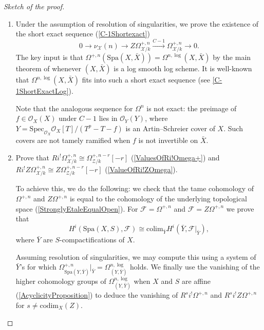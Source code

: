 \documentclass{amsart}
\def\Spa{\textrm{Spa}}
\def\Spec{\textrm{Spec}}
\theoremstyle{definition}
\numberwithin{equation}{section}
\begin{document}
\begin{proof}[Sketch of the proof]
	\begin{enumerate}
			\item Under the assumption of resolution of singularities, we prove the existence of the short exact sequence (\cref{C-1Shortexact})
		\[
		0 \to \nu_{\mathcal{X}}(n) \to Z\Omega^{+,n}_{\mathcal{X}/k} \xrightarrow{C - 1} \Omega^{+,n}_{\mathcal{X}/k} \to 0.
		\]
		The key input is that $\Omega^{+,n}(\Spa(X, \bar{X})) = \Omega^{n,\log}(X, \bar{X})$ by the main theorem of \cite{LogDiff} whenever $(X, \bar{X})$ is a log smooth log scheme. It is well-known that $\Omega^{n,\log}(X, \bar{X})$ fits into such a short exact sequence (see \cref{C-1ShortExactLog}).
		
		
			Note that the analogous sequence for $\Omega^n$ is not exact: the preimage of $f \in \mathcal{O}_X(X)$ under $C - 1$ lies in $\mathcal{O}_Y(Y)$, where $Y = \Spec_{\mathcal{O}_X} \mathcal{O}_X[T]/(T^p - T - f)$ is an Artin--Schreier cover of $X$. Such covers are not tamely ramified when $f$ is not invertible on $\bar{X}$.
					
			\item Prove that $Ri^!\Omega^{+,n}_{\mathcal{X}/k}\cong \Omega^{+,n-r}_{\mathcal{Z}/k}[-r]$ (\cref{ValuesOfRi!Omega+}) and \break $Ri^!Z\Omega^{+,n}_{\mathcal{X}/k}\cong Z\Omega^{+,n-r}_{\mathcal{Z}/k}[-r]$ (\cref{ValueOfRi!ZOmega}).
		
		 To achieve this, we do the following: we check that the tame cohomology of $\Omega^{+,n}$ and $Z\Omega^{+,n}$ is equal to the cohomology of the underlying topological space (\cref{StronglyEtaleEqualOpen}). For $\mathcal{F}=\Omega^{+,n}$ and $\mathcal{F}=Z\Omega^{+,n}$ we prove that  
		\[H^i(\Spa(X,S),\mathcal{F})\cong \textrm{colim}_{\bar{Y}} H^i(\bar{Y},\mathcal{F}|_{\bar{Y}}),
		\]
		where $\bar{Y}$ are $S$-compactifications of $X$.
		
		Assuming resolution of singularities, we may compute this using a system of $\bar{Y}$'s for which $\Omega^{+,n}_{\Spa(Y,\bar{Y})}|_{\bar{Y}}=\Omega^{n,\log}_{(Y,\bar{Y})}$ holds. We finally use the vanishing of the higher cohomology groups of $\Omega^{n,\log}_{(Y,\bar{Y})}$ when $X$ and $S$ are affine (\cref{AcyclicityProposition}) to deduce the vanishing of $R^si^!\Omega^{+,n}$ and $R^si^!Z\Omega^{+,n}$ for $s\neq \textrm{codim}_X(Z)$.
		

\end{enumerate}
\end{proof}
\end{document}
